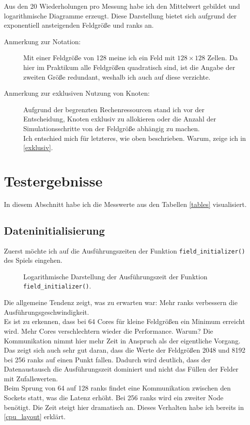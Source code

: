 \documentclass[german,plainarticle,hyperref,utf8]{zihpub}
\begin{document}
	Aus den 20 Wiederholungen pro Messung habe ich den Mittelwert gebildet und logarithmische Diagramme erzeugt. Diese Darstellung bietet sich aufgrund der exponentiell ansteigenden Feldgröße und ranks an.
	\begin{description}
		\item[Anmerkung zur Notation:] Mit einer Feldgröße von 128 meine ich ein Feld mit $128\times 128$ Zellen. Da hier im Praktikum alle Feldgrößen quadratisch sind, ist die Angabe der zweiten Größe redundant, weshalb ich auch auf diese verzichte.
		\item[Anmerkung zur exklusiven Nutzung von Knoten:] Aufgrund der begrenzten Rechenressourcen stand ich vor der Entscheidung, Knoten exklusiv zu allokieren oder die Anzahl der Simulationsschritte von der Feldgröße abhängig zu machen.\\
		Ich entschied mich für letzteres, wie oben beschrieben. Warum, zeige ich in \ref{exklusiv}.
	\end{description}

	\newpage
	\section{Testergebnisse} \label{erg}
	In diesem Abschnitt habe ich die Messwerte aus den Tabellen \ref{tables} visualisiert.
	\subsection{Dateninitialisierung}
	Zuerst möchte ich auf die Ausführungszeiten der Funktion \texttt{field\_initializer()} des Spiels eingehen.\\
	
	\begin{figure}[h]
		\centering
		
		\caption{Logarithmische Darstellung der Ausführungszeit der Funktion \texttt{field\_initializer()}.}
	\end{figure}
	Die allgemeine Tendenz zeigt, was zu erwarten war: Mehr ranks verbessern die Ausführungsgeschwindigkeit.\\
	Es ist zu erkennen, dass bei 64 Cores für kleine Feldgrößen ein Minimum erreicht wird. Mehr Cores verschlechtern wieder die Performance. Warum? Die Kommunikation nimmt hier mehr Zeit in Anspruch als der eigentliche Vorgang.\\
	Das zeigt sich auch sehr gut daran, dass die Werte der Feldgrößen 2048 und 8192 bei 256 ranks auf einen Punkt fallen. Dadurch wird deutlich, dass der Datenaustausch die Ausführungszeit dominiert und nicht das Füllen der Felder mit Zufallswerten.\\
	Beim Sprung von 64 auf 128 ranks findet eine Kommunikation zwischen den Sockets statt, was die Latenz erhöht. Bei 256 ranks wird ein zweiter Node benötigt. Die Zeit steigt hier dramatisch an. Dieses Verhalten habe ich bereits in \ref{cpu_layout} erklärt.
\end{document}
